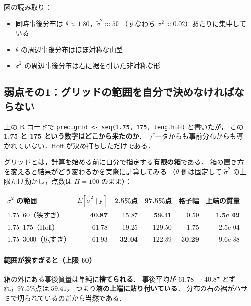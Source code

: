 \documentclass[lualatex,ja=standard,a4paper,12pt]{bxjsarticle}
\begin{document}
\medskip
図の読み取り：
\begin{itemize}
  \item 同時事後分布は $\theta \approx 1.80$，$\tilde{\sigma}^2 \approx 50$
        （すなわち $\sigma^2 \approx 0.02$）あたりに集中している
  \item $\theta$ の周辺事後分布はほぼ対称な山型
  \item $\tilde{\sigma}^2$ の周辺事後分布は右に裾を引いた非対称な形
\end{itemize}

\subsection*{弱点その1：グリッドの範囲を自分で決めなければならない}

上の R コードで \texttt{prec.grid <- seq(1.75, 175, length=H)} と書いたが，
この \textbf{1.75 と 175 という数字はどこから来たのか}．
データからも事前分布からも導かれていない．Hoff が決め打ちしただけである．

\medskip
グリッドとは，計算を始める前に自分で指定する\textbf{有限の箱}である．
箱の置き方を変えると結果がどう変わるかを実際に計算してみる
（$\theta$ 側は固定して $\tilde{\sigma}^2$ の上限だけ動かし，点数は $H=100$ のまま）：

\begin{center}
\renewcommand{\arraystretch}{1.5}
\begin{tabular}{lrrrrr}
\toprule
$\tilde{\sigma}^2$ の範囲 & $E[\tilde{\sigma}^2 \mid \boldsymbol{y}]$
  & 2.5\%点 & 97.5\%点 & 格子幅 & 上端の質量 \\
\midrule
1.75--60（狭すぎ）   & \textbf{40.87} & 15.87 & \textbf{59.41} & 0.59 & \textbf{1.5e-02} \\
1.75--175（Hoff） & 61.78 & 19.25 & 129.50 & 1.75 & 2.5e-04 \\
1.75--3000（広すぎ） & 61.93 & \textbf{32.04} & 122.89 & \textbf{30.29} & 9.6e-88 \\
\bottomrule
\end{tabular}
\end{center}

\paragraph{範囲が狭すぎると（上限 60）}
箱の外にある事後質量は単純に\textbf{捨てられる}．
事後平均が $61.78 \to 40.87$ とずれ，97.5\%点は $59.41$，
つまり\textbf{箱の上端に貼り付いている}．
分布の右の裾がハサミで切られているのだから当然である．
\end{document}
